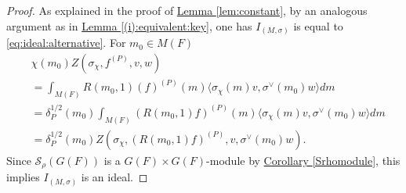 \documentclass[10pt]{amsart}
\newtheorem{lemma}[theorem]{Lemma}
\theoremstyle{definition}
\numberwithin{equation}{section}
\DeclareMathOperator{\vol}{\mathrm{vol}}
\numberwithin{equation}{subsection}
\newcommand{\Ind}{\mathrm{Ind}}
\newcommand{\CC}{\mathbb{C}}
\begin{document}
\begin{proof}
   As explained in the proof of \hyperref[lem:constant]{Lemma \ref{lem:constant}}, by an analogous argument as in \hyperref[(i):equivalent:key]{Lemma \ref{(i):equivalent:key}}, one has $I_{(M,\sigma)}$ is equal to \eqref{eq:ideal:alternative}. For $m_0\in M(F)$
    \begin{align*}
        &\chi(m_0)Z(\sigma_\chi,f^{(P)},v,w)\\
        &=\int_{M(F)}R(m_0,1)(f)^{(P)}(m)\langle \sigma_\chi(m)v,\sigma^\lor(m_0)w\rangle dm\\
        &=\delta_{P}^{1/2}(m_0)\int_{M(F)}(R(m_0,1)f)^{(P)}(m)\langle \sigma_\chi(m)v,\sigma^\lor(m_0)w\rangle dm\\
        &=\delta_{P}^{1/2}(m_0)Z(\sigma_\chi,(R(m_0,1)f)^{(P)},v,\sigma^\lor(m_0)w).
    \end{align*}
    Since $\mathcal{S}_\rho(G(F))$ is a $G(F)\times G(F)$-module by \hyperref[Srhomodule]{Corollary \ref{Srhomodule}}, this implies $I_{(M,\sigma)}$ is an ideal. 
\end{proof}

\end{document}
